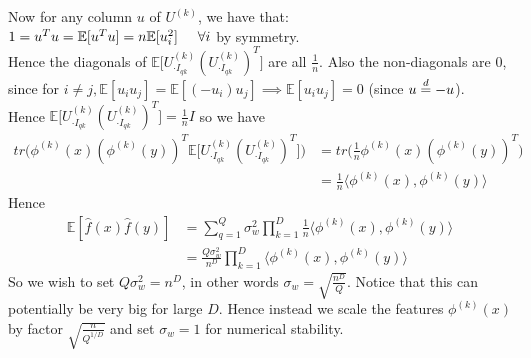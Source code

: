\documentclass[a4paper,10pt]{article}
\begin{document}
Now for any column $u$ of $U^{(k)}$, we have that: \\
$1=u^Tu=\mathbb{E}[u^Tu]=n\mathbb{E}[u^2_i] \hspace{5 mm} \forall i$ by symmetry. \\
Hence the diagonals of $\mathbb{E}\bigg[U^{(k)}_{\cdot I_{qk}}(U^{(k)}_{\cdot I_{qk}})^T\bigg]$ are all $\frac{1}{n}$. Also the non-diagonals are 0, since for $i \neq j, \mathbb{E}[u_iu_j]=\mathbb{E}[(-u_i)u_j] \implies \mathbb{E}[u_iu_j]=0$ (since $u \buildrel d \over = -u$). \\
Hence $\mathbb{E}\bigg[U^{(k)}_{\cdot I_{qk}}(U^{(k)}_{\cdot I_{qk}})^T\bigg]=\frac{1}{n} I$ so we have
\begin{equation}
\begin{aligned}
tr\Big(\phi^{(k)}(x) (\phi^{(k)}(y))^T \mathbb{E}\bigg[U^{(k)}_{\cdot I_{qk}}(U^{(k)}_{\cdot I_{qk}})^T\bigg]\Big)
& =tr\Big(\frac{1}{n} \phi^{(k)}(x) (\phi^{(k)}(y))^T\Big) \\
& = \frac{1}{n} \langle \phi^{(k)}(x), \phi^{(k)}(y) \rangle
\end{aligned}
\end{equation}
Hence
\begin{equation}
\begin{aligned}
\mathbb{E}[\hat{f}(x)\hat{f}(y)]
& =\sum_{q=1}^Q \sigma_w^2 \prod_{k=1}^D \frac{1}{n} \langle \phi^{(k)}(x), \phi^{(k)}(y) \rangle \\
& =\frac{Q \sigma_w^2}{n^D}  \prod_{k=1}^D \langle \phi^{(k)}(x), \phi^{(k)}(y) \rangle
\end{aligned}
\end{equation}
So we wish to set $ Q \sigma_w^2 = n^D$, in other words $\sigma_w= \sqrt{\frac{n^D}{Q}}$. Notice that this can potentially be very big for large $D$. Hence instead we scale the features $\phi^{(k)}(x)$ by factor $\sqrt{\frac{n}{Q^{1/D}}}$ and set $\sigma_w=1$ for numerical stability.
\end{document}
